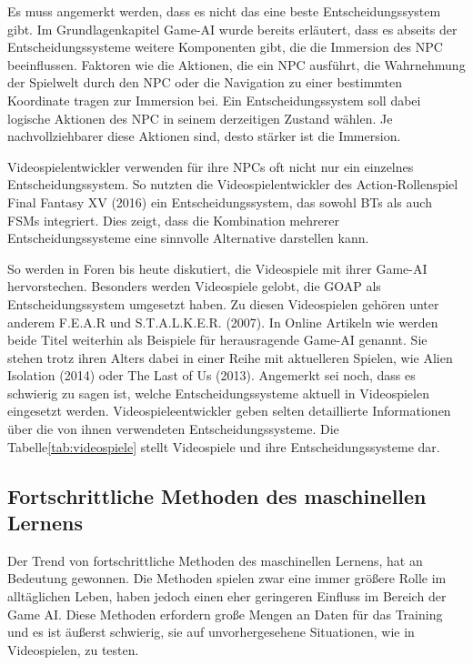 Es muss angemerkt werden, dass es nicht das eine beste Entscheidungssystem gibt. Im Grundlagenkapitel Game-AI wurde bereits erl\"{a}utert, dass es abseits der Entscheidungssysteme weitere Komponenten gibt, die die Immersion des NPC beeinflussen. Faktoren wie die Aktionen, die ein NPC ausf\"{u}hrt, die Wahrnehmung der Spielwelt durch den NPC oder die Navigation zu einer bestimmten Koordinate tragen zur Immersion bei. Ein Entscheidungssystem soll dabei logische Aktionen des NPC in seinem derzeitigen Zustand w\"{a}hlen. Je nachvollziehbarer diese Aktionen sind, desto st\"{a}rker ist die Immersion.

Videospielentwickler verwenden f\"{u}r ihre NPCs oft nicht nur ein einzelnes Entscheidungssystem. So nutzten die Videospielentwickler des Action-Rollenspiel Final Fantasy XV (2016) ein Entscheidungssystem, das sowohl BTs als auch FSMs integriert. Dies zeigt, dass die Kombination mehrerer Entscheidungssysteme eine sinnvolle Alternative darstellen kann.

So werden in Foren bis heute diskutiert, die Videospiele mit ihrer Game-AI hervorstechen. Besonders werden Videospiele gelobt, die GOAP als Entscheidungssystem umgesetzt haben. Zu diesen Videospielen geh\"{o}ren unter anderem F.E.A.R und S.T.A.L.K.E.R. (2007).
In Online Artikeln wie \autocite{vanceai, techopedia, gamerant} werden beide Titel weiterhin als Beispiele f\"{u}r herausragende Game-AI genannt. Sie stehen trotz ihren Alters dabei in einer Reihe mit aktuelleren Spielen, wie Alien Isolation (2014) oder The Last of Us (2013).
Angemerkt sei noch, dass es schwierig zu sagen ist, welche Entscheidungssysteme aktuell in Videospielen eingesetzt werden. Videospieleentwickler geben selten detaillierte Informationen \"{u}ber die von ihnen verwendeten Entscheidungssysteme. Die Tabelle\ref{tab:videospiele} stellt Videospiele und ihre Entscheidungssysteme dar.


\subsection{Fortschrittliche Methoden des maschinellen Lernens}
\label{chap:sota ml}

Der Trend von fortschrittliche Methoden des maschinellen Lernens, hat an Bedeutung gewonnen. Die Methoden spielen zwar eine immer gr\"{o}\ss{}ere Rolle im allt\"{a}glichen Leben, haben jedoch einen eher geringeren Einfluss im Bereich der Game AI. Diese Methoden erfordern gro\ss{}e Mengen an Daten f\"{u}r das Training und es ist \"{a}u\ss{}erst schwierig, sie auf unvorhergesehene Situationen, wie in Videospielen, zu testen. \autocite{U2023}

